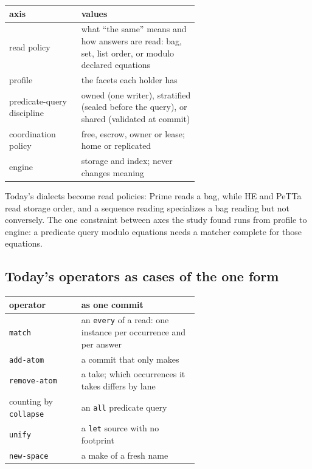 \documentclass[11pt]{article}
\newcommand{\code}[1]{\texttt{#1}}
\newcommand{\PeTTa}{\textup{PeTTa}}
\newcommand{\HE}{\textup{HE}}
\begin{document}
\begin{center}
\small
\begin{tabular}{@{}lp{0.62\linewidth}@{}}
\toprule
axis & values \\
\midrule
read policy & what ``the same'' means and how answers are read: bag, set, list
  order, or modulo declared equations \\
profile & the facets each holder has \\
predicate-query discipline & owned (one writer), stratified (sealed before the query),
  or shared (validated at commit) \\
coordination policy & free, escrow, owner or lease; home or replicated \\
engine & storage and index; never changes meaning \\
\bottomrule
\end{tabular}
\end{center}

\noindent
Today's dialects become read policies: Prime reads a bag, while \HE{} and
\PeTTa{} read storage order, and a sequence reading specializes a bag reading
but not conversely.  The one constraint between axes the study found runs from
profile to engine: a predicate query modulo equations needs a matcher complete for
those equations.

\subsection{Today's operators as cases of the one form}

\begin{center}
\small
\begin{tabular}{@{}lp{0.62\linewidth}@{}}
\toprule
operator & as one commit \\
\midrule
\code{match} & an \code{every} of a read: one instance per occurrence and per answer \\
\code{add-atom} & a commit that only makes \\
\code{remove-atom} & a take; which occurrences it takes differs by lane \\
counting by \code{collapse} & an \code{all} predicate query \\
\code{unify} & a \code{let} source with no footprint \\
\code{new-space} & a make of a fresh name \\
\bottomrule
\end{tabular}
\end{center}
\end{document}
